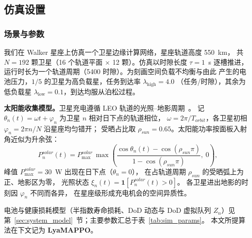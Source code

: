 \documentclass[a4paper,11pt]{article}
\begin{document}
\subsection{仿真设置}
\label{subsec:sim_setup}

\subsubsection{场景与参数}
我们在 Walker 星座上仿真一个卫星边缘计算网络，星座轨道高度 550~km，
共 $N=192$ 颗卫星（16 个轨道平面 $\times$ 12 颗）。仿真以时隙长度 $\tau=1$~s
逐槽推进，运行时长为一个轨道周期（5400 时隙）。为刻画空间负载不均衡与由此
产生的电池压力，$1/5$ 的卫星为高负载星，任务到达率 $\lambda_{\text{high}}=4.0$
（任务/时隙），其余为低负载星 $\lambda_{\text{low}}=0.1$，到达均服从泊松过程。

\textbf{太阳能收集模型。}卫星充电遵循 LEO 轨道的光照--地影周期~\cite{chen2025tasri}。
记 $\theta_n(t)=\omega t+\varphi_n$ 为卫星 $n$ 相对日下点的轨道相位，
$\omega=2\pi/T_{orbit}$，各卫星初相 $\varphi_n=2\pi n/N$ 沿星座均匀错开；
受晒占比取 $\rho_{sun}=0.65$。太阳能功率按面板入射角近似为升余弦：
\begin{equation}
    P^{solar}_n(t)=P^{solar}_{\max}\,
    \max\!\left(\frac{\cos\theta_n(t)-\cos(\rho_{sun}\pi)}
    {1-\cos(\rho_{sun}\pi)},\ 0\right),
    \label{eq:solar_model}
\end{equation}
峰值 $P^{solar}_{\max}=30$~W 出现在日下点（$\theta_n=0$），
在占轨道周期 $\rho_{sun}$ 的受晒弧上为正、地影区为零，
光照状态 $\xi_n(t)=\mathbf{1}[P^{solar}_n(t)>0]$。
各卫星进出地影的时刻因 $\varphi_n$ 不同而各异，
在星座级形成充电机会的空间异质性。

电池与健康损耗模型（半指数寿命损耗、DoD 动态与 DoD 虚拟队列 $Z_n$）见
第~\ref{sec:system_model}~节；主要参数汇总于表~\ref{tab:sim_params}。
本文所提算法在下文记为 \textbf{LyaMAPPO}。
\end{document}

